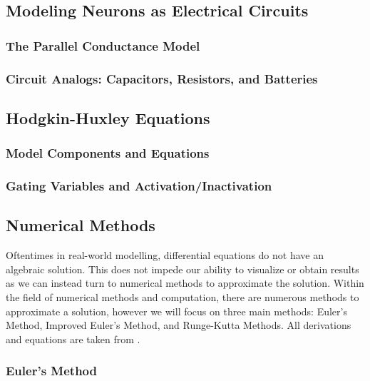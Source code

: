 \documentclass{article} %
\begin{document}
\begin{multicols}{2}
\subsection{Modeling Neurons as Electrical Circuits}
\label{subsec:circuit_model}
\subsubsection{The Parallel Conductance Model}
\label{subsubsec:parallel_conductance}
\subsubsection{Circuit Analogs: Capacitors, Resistors, and Batteries}
\label{subsubsec:circuit_analogs}

\subsection{Hodgkin-Huxley Equations}
\label{subsec:hodgekin_huxley}
\subsubsection{Model Components and Equations}
\label{subsubsec:hh_equations}
\subsubsection{Gating Variables and Activation/Inactivation}
\label{subsubsec:gating_variables}

\subsection{Numerical Methods}
\label{subsec:numerical_methods}

Oftentimes in real-world modelling, differential equations do not have an algebraic solution.
This does not impede our ability to visualize or obtain results as we can instead turn to numerical methods to approximate the solution.
Within the field of numerical methods and computation, there are numerous methods to approximate a solution, however we will focus on three main methods: Euler's Method, Improved Euler's Method, and Runge-Kutta Methods.
All derivations and equations are taken from \cite{brannan2015differential}.

\subsubsection{Euler's Method}
\label{subsubsec:euler_method}


\end{multicols}
\end{document}
